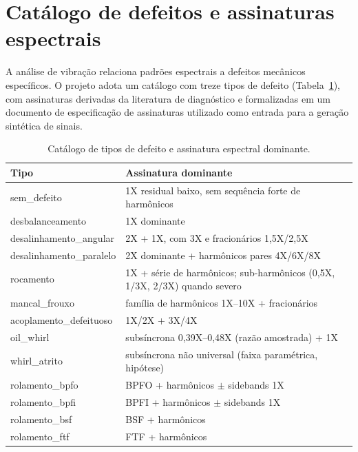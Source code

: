 \section{Catálogo de defeitos e assinaturas espectrais}

A análise de vibração relaciona padrões espectrais a defeitos mecânicos
específicos. O projeto adota um catálogo com treze tipos de defeito
(Tabela~\ref{tab:catalogo}), com assinaturas derivadas da literatura de
diagnóstico \cite{randall2011,scheffer2004} e formalizadas em um documento de
especificação de assinaturas utilizado como entrada para a geração sintética de
sinais.

\begin{table}[htbp]
\centering
\caption{Catálogo de tipos de defeito e assinatura espectral dominante.}
\label{tab:catalogo}
\begin{tabular}{@{}p{4.4cm}p{8.6cm}@{}}
\toprule
\textbf{Tipo} & \textbf{Assinatura dominante} \\
\midrule
sem\_defeito & 1X residual baixo, sem sequência forte de harmônicos \\
desbalanceamento & 1X dominante \\
desalinhamento\_angular & 2X + 1X, com 3X e fracionários 1,5X/2,5X \\
desalinhamento\_paralelo & 2X dominante + harmônicos pares 4X/6X/8X \\
rocamento & 1X + série de harmônicos; sub-harmônicos (0,5X, 1/3X, 2/3X) quando severo \\
mancal\_frouxo & família de harmônicos 1X--10X + fracionários \\
acoplamento\_defeituoso & 1X/2X + 3X/4X \\
oil\_whirl & subsíncrona 0,39X--0,48X (razão amostrada) + 1X \\
whirl\_atrito & subsíncrona não universal (faixa paramétrica, hipótese) \\
rolamento\_bpfo & BPFO + harmônicos $\pm$ sidebands 1X \\
rolamento\_bpfi & BPFI + harmônicos $\pm$ sidebands 1X \\
rolamento\_bsf & BSF + harmônicos \\
rolamento\_ftf & FTF + harmônicos \\
\bottomrule
\end{tabular}
\par\vspace{2pt}{\footnotesize Fonte: SPECIFICATION.md do projeto; docs/assinaturas\_fft\_falhas\_maquinas\_rotativas\_IA.md.}
\end{table}

